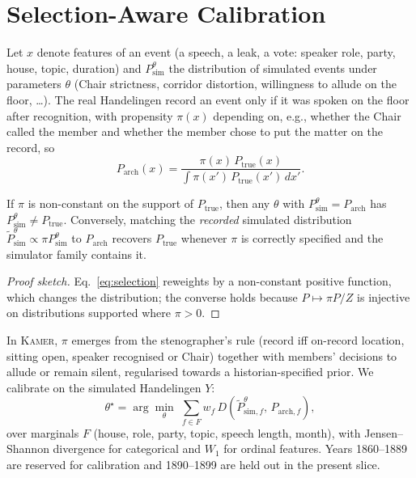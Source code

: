\documentclass[sigconf,review,anonymous]{acmart}
\newcommand{\sys}{\textsc{Kamer}}
\begin{document}
\section{Selection-Aware Calibration}
\label{sec:calibration}

Let $x$ denote features of an event (a speech, a leak, a vote: speaker
role, party, house, topic, duration) and $P^\theta_{\text{sim}}$ the
distribution of simulated events under parameters $\theta$ (Chair
strictness, corridor distortion, willingness to allude on the floor,
\ldots). The real Handelingen record an event only if it was spoken on the
floor after recognition, with propensity $\pi(x)$ depending on, e.g.,
whether the Chair called the member and whether the member chose to put
the matter on the record, so
\begin{equation}
P_{\text{arch}}(x)=\frac{\pi(x)\,P_{\text{true}}(x)}{\int \pi(x')\,P_{\text{true}}(x')\,dx'}.
\label{eq:selection}
\end{equation}

\begin{proposition}
\label{prop:gap}
If $\pi$ is non-constant on the support of $P_{\text{true}}$, then any
$\theta$ with $P^{\theta}_{\text{sim}}=P_{\text{arch}}$ has
$P^{\theta}_{\text{sim}}\neq P_{\text{true}}$. Conversely, matching the
\emph{recorded} simulated distribution $\tilde P^\theta_{\text{sim}}\propto
\pi P^\theta_{\text{sim}}$ to $P_{\text{arch}}$ recovers $P_{\text{true}}$
whenever $\pi$ is correctly specified and the simulator family contains it.
\end{proposition}
\begin{proof}[Proof sketch]
Eq.~\eqref{eq:selection} reweights by a non-constant positive function,
which changes the distribution; the converse holds because
$P\mapsto\pi P/Z$ is injective on distributions supported where $\pi>0$.
\end{proof}

In \sys{}, $\pi$ emerges from the stenographer's rule (record iff
on-record location, sitting open, speaker recognised or Chair) together
with members' decisions to allude or remain silent, regularised towards a
historian-specified prior. We calibrate on the simulated Handelingen $Y$:
\begin{equation}
\theta^\star=\arg\min_{\theta}\;\sum_{f\in F} w_f\,
D\!\left(\tilde P^{\theta}_{\text{sim},f},\,P_{\text{arch},f}\right),
\label{eq:calib}
\end{equation}
over marginals $F$ (house, role, party, topic, speech length, month), with
Jensen--Shannon divergence for categorical and $W_1$ for ordinal features.
Years 1860--1889 are reserved for calibration and 1890--1899 are held out
in the present slice.
\end{document}
